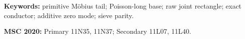 \documentclass[11pt]{article}
\theoremstyle{definition}
\theoremstyle{remark}
\begin{document}
\noindent\textbf{Keywords:} primitive M\"obius tail; Poisson-long
base; raw joint rectangle; exact conductor; additive zero mode; sieve
parity.

\medskip
\noindent\textbf{MSC 2020:} Primary 11N35, 11N37; Secondary
11L07, 11L40.









\clearpage
\begingroup
\footnotesize


\endgroup
\end{document}
